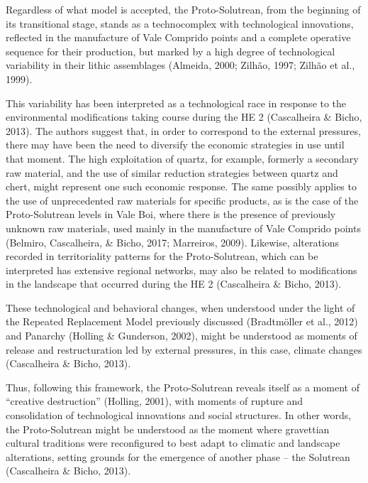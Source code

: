\documentclass[12pt,twoside]{reedthesis}
\begin{document}
Regardless of what model is accepted, the Proto-Solutrean, from the beginning of its transitional stage, stands as a technocomplex with technological innovations, reflected in the manufacture of Vale Comprido points and a complete operative sequence for their production, but marked by a high degree of technological variability in their lithic assemblages (Almeida, 2000; Zilhão, 1997; Zilhão et al., 1999).

This variability has been interpreted as a technological race in response to the environmental modifications taking course during the HE 2 (Cascalheira \& Bicho, 2013). The authors suggest that, in order to correspond to the external pressures, there may have been the need to diversify the economic strategies in use until that moment. The high exploitation of quartz, for example, formerly a secondary raw material, and the use of similar reduction strategies between quartz and chert, might represent one such economic response. The same possibly applies to the use of unprecedented raw materials for specific products, as is the case of the Proto-Solutrean levels in Vale Boi, where there is the presence of previously unknown raw materials, used mainly in the manufacture of Vale Comprido points (Belmiro, Cascalheira, \& Bicho, 2017; Marreiros, 2009). Likewise, alterations recorded in territoriality patterns for the Proto-Solutrean, which can be interpreted has extensive regional networks, may also be related to modifications in the landscape that occurred during the HE 2 (Cascalheira \& Bicho, 2013).

These technological and behavioral changes, when understood under the light of the Repeated Replacement Model previously discussed (Bradtmöller et al., 2012) and Panarchy (Holling \& Gunderson, 2002), might be understood as moments of release and restructuration led by external pressures, in this case, climate changes (Cascalheira \& Bicho, 2013).

Thus, following this framework, the Proto-Solutrean reveals itself as a moment of ``creative destruction'' (Holling, 2001), with moments of rupture and consolidation of technological innovations and social structures. In other words, the Proto-Solutrean might be understood as the moment where gravettian cultural traditions were reconfigured to best adapt to climatic and landscape alterations, setting grounds for the emergence of another phase -- the Solutrean (Cascalheira \& Bicho, 2013).
\end{document}
